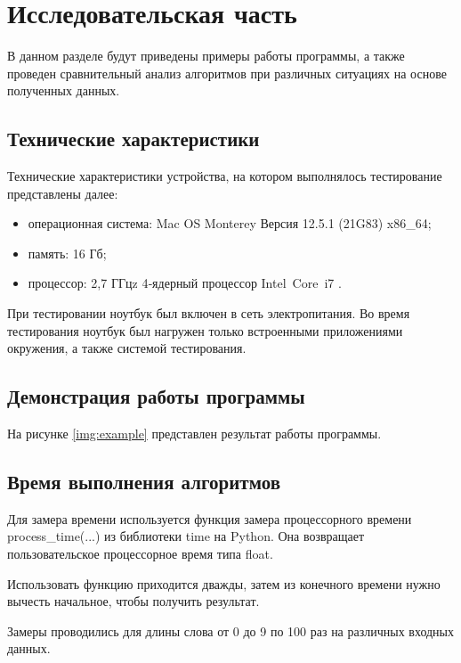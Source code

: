 \chapter{Исследовательская часть}

В данном разделе будут приведены примеры работы программы, а также проведен сравнительный анализ алгоритмов при различных ситуациях на основе полученных данных.

\section{Технические характеристики}

Технические характеристики устройства, на котором выполнялось тестирование представлены далее:

\begin{itemize}
    \item операционная система: Mac OS Monterey Версия 12.5.1 (21G83) \cite{macos} x86\_64;
    \item память: 16 Гб;
    \item процессор: 2,7 ГГцz 4‑ядерный процессор Intel Core i7 \cite{intel}.
\end{itemize}

При тестировании ноутбук был включен в сеть электропитания. Во время тестирования ноутбук был нагружен только встроенными приложениями окружения, а также системой тестирования.

\section{Демонстрация работы программы}

На рисунке \ref{img:example} представлен результат работы программы.

\clearpage

\section{Время выполнения алгоритмов}

Для замера времени используется функция замера процессорного времени process\_time(...) из библиотеки time на Python. Она возвращает пользовательское процессорное время типа float.

Использовать функцию приходится дважды, затем из конечного времени нужно вычесть начальное, чтобы получить результат.

Замеры проводились для длины слова от 0 до 9 по 100 раз на различных входных данных.

